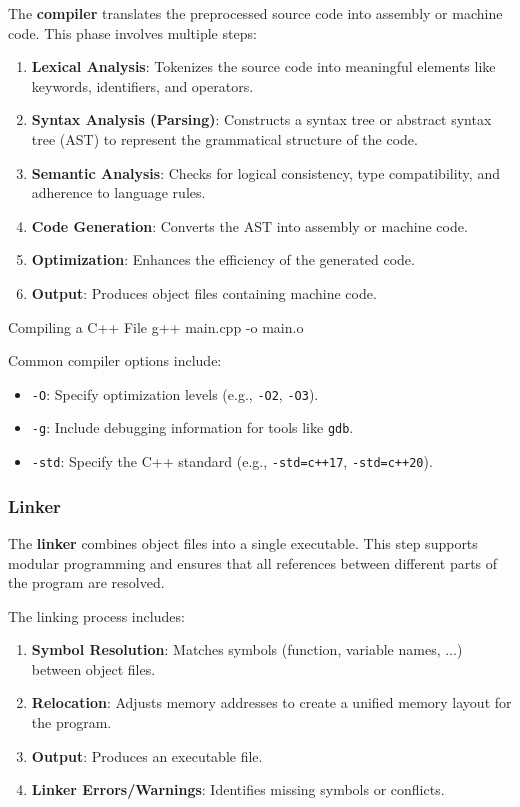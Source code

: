     The \textbf{compiler} translates the preprocessed source code into assembly or machine code. This phase involves multiple steps:
    \begin{enumerate}
        \item \textbf{Lexical Analysis}: Tokenizes the source code into meaningful elements like keywords, identifiers, and operators.
        \item \textbf{Syntax Analysis (Parsing)}: Constructs a syntax tree or abstract syntax tree (AST) to represent the grammatical structure of the code.
        \item \textbf{Semantic Analysis}: Checks for logical consistency, type compatibility, and adherence to language rules.
        \item \textbf{Code Generation}: Converts the AST into assembly or machine code.
        \item \textbf{Optimization}: Enhances the efficiency of the generated code.
        \item \textbf{Output}: Produces object files containing machine code.
    \end{enumerate}
    
    \begin{neonlisting}[language=bash]{Compiling a C++ File}
g++ main.cpp -o main.o
    \end{neonlisting}
    
    Common compiler options include:
    \begin{itemize}
        \item \texttt{-O}: Specify optimization levels (e.g., \texttt{-O2}, \texttt{-O3}).
        \item \texttt{-g}: Include debugging information for tools like \texttt{gdb}.
        \item \texttt{-std}: Specify the C++ standard (e.g., \texttt{-std=c++17}, \texttt{-std=c++20}).
    \end{itemize}

\subsubsection{Linker}
    
    The \textbf{linker} combines object files into a single executable. This step supports modular programming and ensures that all references between different parts of the program are resolved.
    
    The linking process includes:
    \begin{enumerate}
        \item \textbf{Symbol Resolution}: Matches symbols (function, variable names, ...) between object files.
        \item \textbf{Relocation}: Adjusts memory addresses to create a unified memory layout for the program.
        \item \textbf{Output}: Produces an executable file.
        \item \textbf{Linker Errors/Warnings}: Identifies missing symbols or conflicts.
    \end{enumerate}
    
